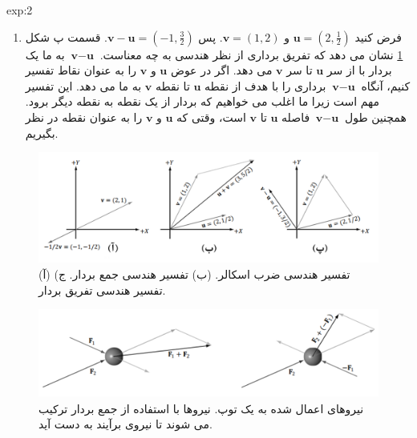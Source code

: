 {\begin{spacing}{1.5}
\begin{example}{exp:2}
\begin{enumerate}[label=\textbf{\arabic*}.]
                \item {فرض کنید $\textbf{u}=(2,\frac{\displaystyle 1}{\displaystyle 2})$ و $\textbf{v}=(1,2)$. پس $\textbf{v}-\textbf{u}=(-1,\frac{\displaystyle 3}{\displaystyle 2})$.
                قسمت پ شکل \ref{fig:4.Session.1.1.6} نشان می دهد که تفریق برداری از نظر هندسی به چه معناست.
                    $\textbf{v}-\textbf{u}$ به ما یک بردار با از سر $\textbf{u}$ تا سر $\textbf{v}$ می دهد.
                    اگر در عوض $\textbf{u}$ و $\textbf{v}$ را به عنوان نقاط تفسیر کنیم، آنگاه $\textbf{v}-\textbf{u}$ برداری را با هدف از نقطه $\textbf{u}$ تا نقطه $\textbf{v}$ به ما می دهد.
                    این تفسیر مهم است زیرا ما اغلب می خواهیم که بردار از یک نقطه به نقطه دیگر برود.
                    همچنین طول $\textbf{v}-\textbf{u}$ فاصله $\textbf{u}$ تا $\textbf{v}$ است، وقتی که $\textbf{u}$ و $\textbf{v}$ را به عنوان نقطه در نظر بگیریم.}
            \end{enumerate}

            \begin{figure}[H]
                \centering
                \setlength{\belowcaptionskip}{-10pt}
                \includegraphics[width=\textwidth]{Images/4/4.Session.1.1.6}
                \caption{(آ) تفسیر هندسی ضرب اسکالر. (ب) تفسیر هندسی جمع بردار. ج) تفسیر هندسی تفریق بردار.}
                \label{fig:4.Session.1.1.6}
            \end{figure}

            \begin{figure}[H]
                \centering
                \setlength{\belowcaptionskip}{-10pt}
                \includegraphics[width=\textwidth]{Images/4/4.Session.1.1.7}
                \caption{نیروهای اعمال شده به یک توپ. نیروها با استفاده از جمع بردار ترکیب می شوند تا نیروی برآیند به دست آید. \textbf{\vspace{10pt}}}
                \label{fig:4.Session.1.1.7}
            \end{figure}
        \end{example}
    \end{spacing}
}


